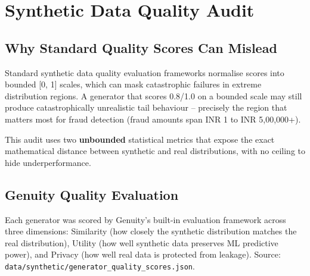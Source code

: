 \documentclass[12pt,a4paper,oneside]{book}
\begin{document}
\clearpage

\chapter{Synthetic Data Quality Audit}
\label{sec:quality_audit}
\thispagestyle{fancy}

\section{Why Standard Quality Scores Can Mislead}

Standard synthetic data quality evaluation frameworks normalise scores into bounded [0, 1] scales, which can mask catastrophic failures in extreme distribution regions. A generator that scores 0.8/1.0 on a bounded scale may still produce catastrophically unrealistic tail behaviour -- precisely the region that matters most for fraud detection (fraud amounts span INR 1 to INR 5,00,000+).

This audit uses two \textbf{unbounded} statistical metrics that expose the exact mathematical distance between synthetic and real distributions, with no ceiling to hide underperformance.

\section{Genuity Quality Evaluation}

Each generator was scored by Genuity's built-in evaluation framework across three dimensions: Similarity (how closely the synthetic distribution matches the real distribution), Utility (how well synthetic data preserves ML predictive power), and Privacy (how well real data is protected from leakage). Source: \texttt{data/synthetic/generator\_quality\_scores.json}.
\end{document}

